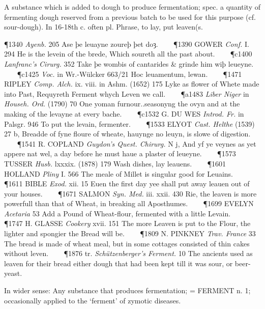 \begin{description}[wide, labelwidth=!, labelindent=0pt]
\begin{myenumerate}

 A substance which is added to dough to produce fermentation; spec. a quantity of fermenting dough reserved from a previous batch to be used for this purpose (cf. sour-dough). In 16-18th c. often pl. Phrase, to lay, put leaven(s.

\P 1340  \textit{Ayenb.} 205 Ase þe leuayne zoureþ þet doȝ.    
\P 1390 GOWER  \textit{Conf.} I. 294 He is the levein of the brede, Which soureth all the past about.    
\P c1400 \textit{Lanfranc's  Cirurg.} 352 Take þe wombis of cantarides \& grinde him wiþ leueyne.    
\P c1425 \textit{Voc.} in  Wr.-Wülcker 663/21 Hoc leuamentum, lewan.    
\P 1471 RIPLEY  \textit{Comp. Alch.} ix. viii. in Ashm. (1652) 175 Lyke as flower of Whete made into Past, Requyreth Ferment whych Leven we call.    
\P a1483 \textit{Liber Niger} in  \textit{Househ. Ord.} (1790) 70 One yoman furnour..seasonyng the ovyn and at the making of the levayne at every bache.    
\P c1532 G. DU WES  \textit{Introd. Fr.} in Palsgr. 946 To put the levain, fermenter.    
\P 1533 ELYOT  \textit{Cast. Helthe} (1539) 27 b, Breadde of fyne floure of wheate, hauynge no leuyn, is slowe of digestion.    
\P 1541 R. COPLAND  \textit{Guydon's Quest. Chirurg.} N j, And yf ye veynes as yet appere nat wel, a day before he must haue a plaster of leueyne.    
\P 1573 TUSSER  \textit{Husb.} lxxxix. (1878) 179 Wash dishes, lay leauens.    
\P 1601 HOLLAND  \textit{Pliny} I. 566 The meale of Millet is singular good for Leuains.    
\P 1611 BIBLE  \textit{Exod.} xii. 15 Euen the first day yee shall put away leauen out of your houses.    
\P 1671 SALMON  \textit{Syn. Med.} iii. xxii. 430 Rie, the leaven is more powerfull than that of Wheat, in breaking all Aposthumes.    
\P 1699 EVELYN  \textit{Acetaria} 53 Add a Pound of Wheat-flour, fermented with a little Levain.    
\P 1747 H. GLASSE  \textit{Cookery} xvii. 151 The more Leaven is put to the Flour, the lighter and spongier the Bread will be.    
\P 1809 N. PINKNEY  \textit{Trav. France} 33 The bread is made of wheat meal, but in some cottages consisted of thin cakes without leven.    
\P 1876 tr.  \textit{Schützenberger's Ferment.} 10 The ancients used as leaven for their bread either dough that had been kept till it was sour, or beer-yeast.

 In wider sense: Any substance that produces fermentation; = FERMENT n. 1; occasionally applied to the ‘ferment’ of zymotic diseases.


\end{myenumerate}
\end{description}
